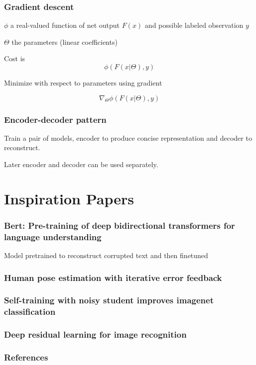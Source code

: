 \documentclass{beamer}
\begin{document}
\frame
{
   \frametitle{Gradient descent}

   $\phi$ a real-valued function of net output $F(x)$ and possible labeled observation $y$

   $\Theta$ the parameters (linear coefficients)

   Cost is
   $$\phi(F(x|\Theta), y)$$

   Minimize with respect to parameters using gradient 

   $$\nabla_\Theta \phi(F(x|\Theta), y)$$
}

\frame
{
   \frametitle{Encoder-decoder pattern}

   Train a pair of models, encoder to produce concise representation and decoder to reconstruct.

   Later encoder and decoder can be used separately. 
}

\section{Inspiration Papers}

\frame
{
   \frametitle{Bert: Pre-training of deep bidirectional transformers for language understanding}

   \cite{devlin2018bert}

   Model pretrained to reconstruct corrupted text and then finetuned
}

\frame
{
   \frametitle{Human pose estimation with iterative error feedback}

   \cite{carreira2016human}

   
}

\frame
{
   \frametitle{Self-training with noisy student improves imagenet classification}

   \cite{xie2020self}

}

\frame
{
   \frametitle{Deep residual learning for image recognition}

   \cite{he2016deep}

}

\begin{frame}[t,allowframebreaks]
\frametitle{References}
\printbibliography
\end{frame}
\end{document}
